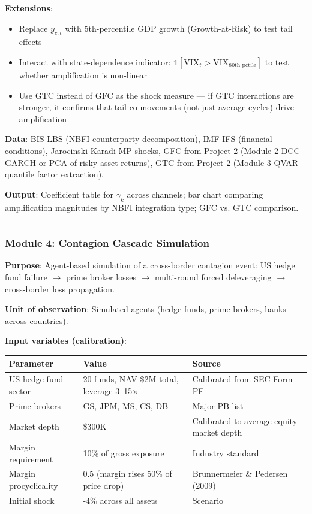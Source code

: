 \documentclass[11pt,a4paper]{article}
\begin{document}
\textbf{Extensions}:
\begin{itemize}
\item Replace $y_{c,t}$ with 5th-percentile GDP growth (Growth-at-Risk) to test tail effects
\item Interact with state-dependence indicator: $\mathbb{1}[\text{VIX}_t > \text{VIX}_{80\text{th pctile}}]$ to test whether amplification is non-linear
\item Use GTC instead of GFC as the shock measure --- if GTC interactions are stronger, it confirms that tail co-movements (not just average cycles) drive amplification

\end{itemize}
\textbf{Data}: BIS LBS (NBFI counterparty decomposition), IMF IFS (financial conditions), Jarocinski-Karadi MP shocks, GFC from Project 2 (Module 2 DCC-GARCH or PCA of risky asset returns), GTC from Project 2 (Module 3 QVAR quantile factor extraction).

\textbf{Output}: Coefficient table for $\gamma_k$ across channels; bar chart comparing amplification magnitudes by NBFI integration type; GFC vs. GTC comparison.


\bigskip\noindent\rule{\textwidth}{0.4pt}\bigskip


\subsubsection{Module 4: Contagion Cascade Simulation}

\textbf{Purpose}: Agent-based simulation of a cross-border contagion event: US hedge fund failure $\rightarrow$ prime broker losses $\rightarrow$ multi-round forced deleveraging $\rightarrow$ cross-border loss propagation.

\textbf{Unit of observation}: Simulated agents (hedge funds, prime brokers, banks across countries).

\textbf{Input variables (calibration)}:


{\small
\begin{longtable}{|p{}|p{}|p{}|}
\hline
\textbf{Parameter} & \textbf{Value} & \textbf{Source} \\
\hline
\endhead
US hedge fund sector & 20 funds, NAV \$2M total, leverage 3--15$\times$ & Calibrated from SEC Form PF \\
\hline
Prime brokers & GS, JPM, MS, CS, DB & Major PB list \\
\hline
Market depth & \$300K & Calibrated to average equity market depth \\
\hline
Margin requirement & 10\% of gross exposure & Industry standard \\
\hline
Margin procyclicality & 0.5 (margin rises 50\% of price drop) & Brunnermeier \& Pedersen (2009) \\
\hline
Initial shock & -4\% across all assets & Scenario \\
\hline
\end{longtable}
}
\end{document}
